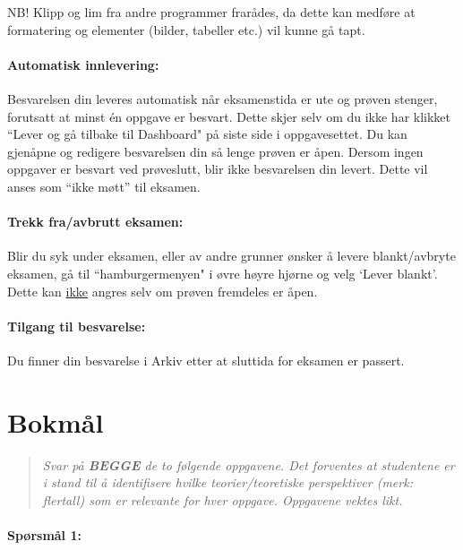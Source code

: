 \documentclass[a4paper,12pt,fleqn]{article}
\begin{document}
NB! Klipp og lim fra andre programmer frarådes, da dette kan medføre at
formatering og elementer (bilder, tabeller etc.) vil kunne gå tapt.

\paragraph{\textbf{Automatisk innlevering:}} Besvarelsen din leveres automatisk
når eksamenstida er ute og prøven stenger, forutsatt at minst én oppgave er
besvart. Dette skjer selv om du ikke har klikket ``Lever og gå tilbake til
Dashboard" på siste side i oppgavesettet. Du kan gjenåpne og redigere
besvarelsen din så lenge prøven er åpen. Dersom ingen oppgaver er besvart ved
prøveslutt, blir ikke besvarelsen din levert. Dette vil anses som “ikke møtt”
til eksamen.

\paragraph{\textbf{Trekk fra/avbrutt eksamen:}} Blir du syk under eksamen, eller
av andre grunner ønsker å levere blankt/avbryte eksamen, gå til
``hamburgermenyen" i øvre høyre hjørne og velg `Lever blankt'. Dette kan
\underline{ikke} angres selv om prøven fremdeles er åpen.

\paragraph{\textbf{Tilgang til besvarelse:}}  Du finner din besvarelse i Arkiv
etter at sluttida for eksamen er passert.

\clearpage

\section*{Bokmål}

\bigskip

\begin{quote} \textit{Svar på \textbf{BEGGE} de to følgende oppgavene. Det
forventes at studentene er i stand til å identifisere hvilke teorier/teoretiske
perspektiver (merk: flertall) som er relevante for hver oppgave. Oppgavene
vektes likt.} \end{quote}

\bigskip

\paragraph{\textbf{Spørsmål 1:}}
\end{document}
